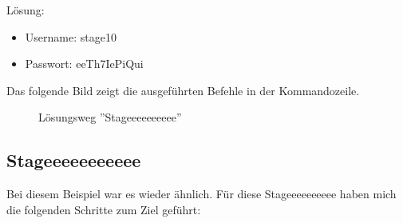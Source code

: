 \documentclass[12pt, a4paper, titlepage, oneside]{scrartcl}
\begin{document}
	Lösung:
	\begin{itemize}
		\item Username: stage10

		\item Passwort: eeTh7IePiQui
	\end{itemize}

	Das folgende Bild zeigt die ausgeführten Befehle in der Kommandozeile.

	\begin{figure}[h!]
		\centering
		\caption{Lösungsweg ''Stageeeeeeeeee''}
		\label{fig:stageeeeeeeeee_solution}
	\end{figure}

	\newpage

	\subsection{Stageeeeeeeeeee}
	Bei diesem Beispiel war es wieder ähnlich. Für diese Stageeeeeeeeee haben mich
	die folgenden Schritte zum Ziel geführt:
\end{document}
